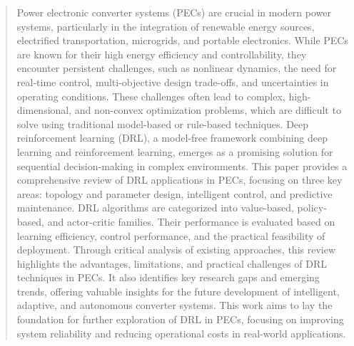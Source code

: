 \begin{abstract}
Power electronic converter systems (PECs) are crucial in modern power systems, particularly in the integration of renewable energy sources, electrified transportation, microgrids, and portable electronics. While PECs are known for their high energy efficiency and controllability, they encounter persistent challenges, such as nonlinear dynamics, the need for real-time control, multi-objective design trade-offs, and uncertainties in operating conditions. These challenges often lead to complex, high-dimensional, and non-convex optimization problems, which are difficult to solve using traditional model-based or rule-based techniques. Deep reinforcement learning (DRL), a model-free framework combining deep learning and reinforcement learning, emerges as a promising solution for sequential decision-making in complex environments. This paper provides a comprehensive review of DRL applications in PECs, focusing on three key areas: topology and parameter design, intelligent control, and predictive maintenance. DRL algorithms are categorized into value-based, policy-based, and actor-critic families. Their performance is evaluated based on learning efficiency, control performance, and the practical feasibility of deployment. Through critical analysis of existing approaches, this review highlights the advantages, limitations, and practical challenges of DRL techniques in PECs. It also identifies key research gaps and emerging trends, offering valuable insights for the future development of intelligent, adaptive, and autonomous converter systems. This work aims to lay the foundation for further exploration of DRL in PECs, focusing on improving system reliability and reducing operational costs in real-world applications.
\end{abstract}
